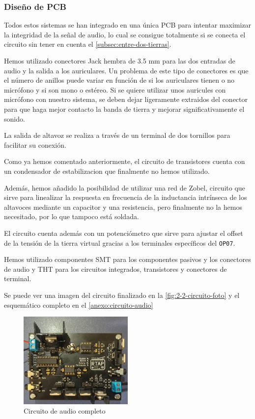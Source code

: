 \subsubsection{Diseño de PCB}

Todos estos sistemas se han integrado en una única PCB para intentar maximizar la integridad de la señal de audio, lo cual se consigue totalmente si se conecta el circuito sin tener en cuenta el \autoref{subsec:entre-dos-tierras}.

Hemos utilizado conectores Jack hembra de 3.5 mm para las dos entradas de audio y la salida a los auriculares. Un problema de este tipo de conectores es que el número de anillos puede variar en función de si los auriculares tienen o no micrófono y si son mono o estéreo. Si se quiere utilizar unos auricules con micrófono con nuestro sistema, se deben dejar ligeramente extraidos del conector para que haga mejor contacto la banda de tierra y mejorar significativamente el sonido.

La salida de altavoz se realiza a través de un terminal de dos tornillos para facilitar su conexión.

Como ya hemos comentado anteriormente, el circuito de transistores cuenta con un condensador de estabilizacion que finalmente no hemos utilizado. 

Además, hemos añadido la posibilidad de utilizar una red de Zobel, circuito que sirve para linealizar la respuesta en frecuencia de la inductancia intrínseca de los altavoces mediante un capacitor y una resistencia, pero finalmente no la hemos necesitado, por lo que tampoco está soldada.

El circuito cuenta además con un potenciómetro que sirve para ajustar el offset de la tensión de la tierra virtual gracias a los terminales específicos del \texttt{OP07}.

Hemos utilizado componentes SMT para los componentes pasivos y los conectores de audio y THT para los circuitos integrados, transistores y conectores de terminal.

Se puede ver una imagen del circuito finalizado en la \autoref{fig:2-2-circuito-foto} y el esquemático completo en el \autoref{anexo:circuito-audio}

\begin{figure}[h]
    \centering
    \includegraphics[width=0.5\textwidth]{images/2/2-2/circuito-foto.jpg}
    \caption{Circuito de audio completo}
    \label{fig:2-2-circuito-foto}
\end{figure}